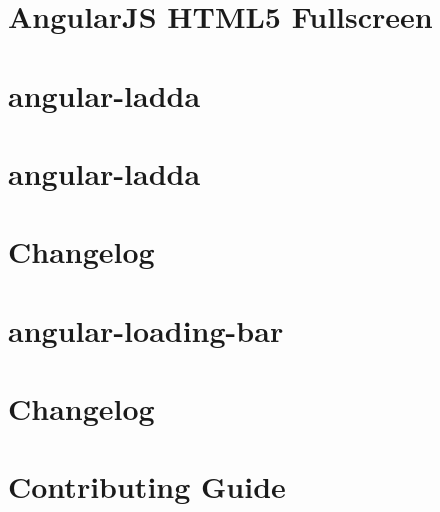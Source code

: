 \documentclass[twoside]{book}
\newcommand{\+}{\discretionary{\mbox{\scriptsize$\hookleftarrow$}}{}{}}
\begin{document}
\chapter{Angular\+JS H\+T\+M\+L5 Fullscreen}
\label{md_app_web_bower_components_angular-fullscreen__r_e_a_d_m_e}

\chapter{angular-\/ladda}
\label{md_app_web_bower_components_angular-ladda__c_h_a_n_g_e_l_o_g}

\chapter{angular-\/ladda}
\label{md_app_web_bower_components_angular-ladda__r_e_a_d_m_e}

\chapter{Changelog}
\label{md_app_web_bower_components_angular-loading-bar__c_h_a_n_g_e_l_o_g}

\chapter{angular-\/loading-\/bar}
\label{md_app_web_bower_components_angular-loading-bar__r_e_a_d_m_e}

\chapter{Changelog}
\label{md_app_web_bower_components_angular-moment__c_h_a_n_g_e_l_o_g}

\chapter{Contributing Guide}
\label{md_app_web_bower_components_angular-moment__c_o_n_t_r_i_b_u_t_i_n_g}

\end{document}
